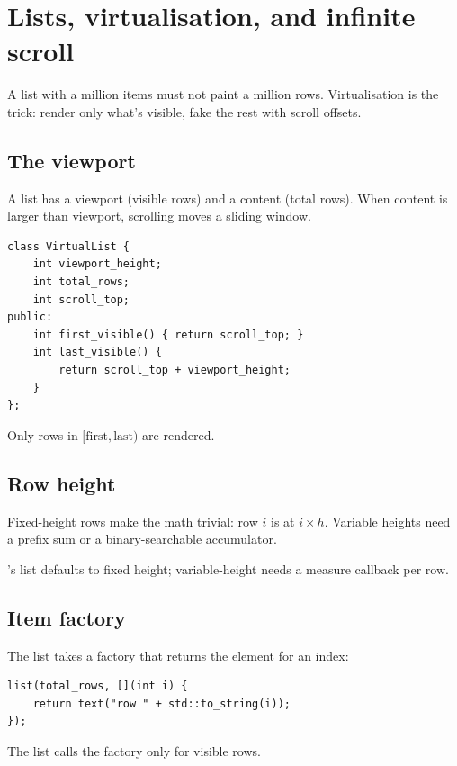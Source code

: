 \chapter{Lists, virtualisation, and infinite scroll}
\label{ch:lists}

\begin{aside}
A list with a million items must not paint a million rows.
Virtualisation is the trick: render only what's visible, fake
the rest with scroll offsets.
\end{aside}

\section{The viewport}

A list has a viewport (visible rows) and a content (total
rows). When content is larger than viewport, scrolling moves
a sliding window.

\begin{lstlisting}
class VirtualList {
    int viewport_height;
    int total_rows;
    int scroll_top;
public:
    int first_visible() { return scroll_top; }
    int last_visible() {
        return scroll_top + viewport_height;
    }
};
\end{lstlisting}

Only rows in $[\text{first}, \text{last})$ are rendered.

\section{Row height}

Fixed-height rows make the math trivial: row $i$ is at $i
\times h$. Variable heights need a prefix sum or a
binary-searchable accumulator.

\maya{}'s list defaults to fixed height; variable-height
needs a measure callback per row.

\section{Item factory}

The list takes a factory that returns the element for an
index:

\begin{lstlisting}
list(total_rows, [](int i) {
    return text("row " + std::to_string(i));
});
\end{lstlisting}

The list calls the factory only for visible rows.

